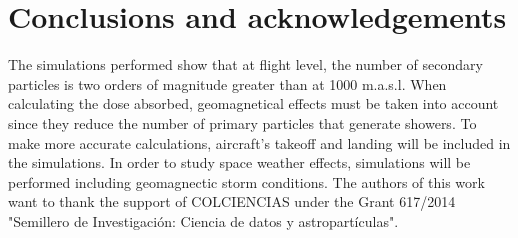 \documentclass[3p,times,twocolumn]{elsarticle}
\begin{document}
\section{Conclusions and acknowledgements}
\label{sec:conclusions}
The simulations performed show that at flight level, the number of secondary particles is two orders of magnitude greater than at 1000 m.a.s.l. When calculating the dose absorbed, geomagnetical effects must be taken into account since they reduce the number of primary particles that generate showers. To make more accurate calculations, aircraft's takeoff and landing will be included in the simulations. In order to study space weather effects, simulations will be performed including geomagnectic storm conditions. The authors of this work want to thank the support of COLCIENCIAS under the Grant 617/2014 "Semillero de  Investigaci\'on: Ciencia de datos y astropart\'iculas".











\end{document}
